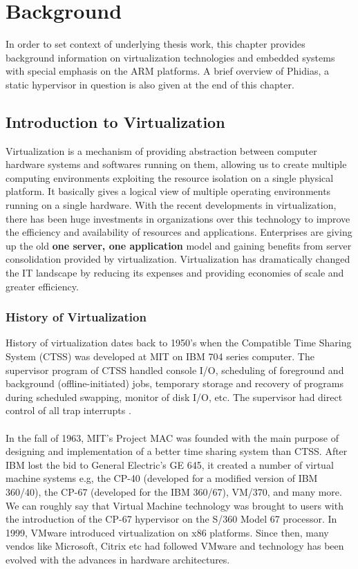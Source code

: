 \chapter{Background \label{cha:chapter2}}

In order to set context of underlying thesis work, this chapter provides background information on virtualization technologies and embedded systems with special emphasis on the ARM platforms. A brief overview of Phidias, a static hypervisor in question is also given at the end of this chapter.

\section{Introduction to Virtualization \label{sec:tech}}
Virtualization is a mechanism of providing abstraction between computer hardware systems and softwares running on them, allowing us to create multiple computing environments exploiting the resource isolation on a single physical platform. It basically gives a logical view of multiple operating environments running on a single hardware. With the recent developments in virtualization, there has been huge investments in organizations over this technology to improve the efficiency and availability of resources and applications. Enterprises are giving up the old \textbf{one server, one application} model and gaining benefits from server consolidation provided by virtualization. Virtualization has dramatically changed the IT landscape by reducing its expenses and providing economies of scale and greater efficiency.

\subsection{History of Virtualization\label{sec:history}}
History of virtualization dates back to 1950's when the Compatible Time Sharing System (CTSS) was developed at MIT on IBM 704 series computer. The supervisor program of CTSS handled console I/O, scheduling of foreground and background (offline-initiated) jobs, temporary storage and recovery of programs during scheduled swapping, monitor of disk I/O, etc. The supervisor had direct control of all trap interrupts \cite{introtousevirtualization}.\\
\\
In the fall of 1963, MIT's Project MAC was founded with the main purpose of designing and implementation of a better time sharing system than CTSS. After IBM lost the bid to General Electric's GE 645, it created a number of virtual machine systems e.g, the CP-40 (developed for a modified version of IBM 360/40), the CP-67 (developed for the IBM 360/67), VM/370, and many more. We can roughly say that Virtual Machine technology was brought to users with the introduction of the CP-67 hypervisor on the S/360 Model 67 processor. In 1999, VMware introduced virtualization on x86 platforms. Since then, many vendos like Microsoft, Citrix etc had followed VMware and technology has been evolved with the advances in hardware architectures. 
\\
\\
